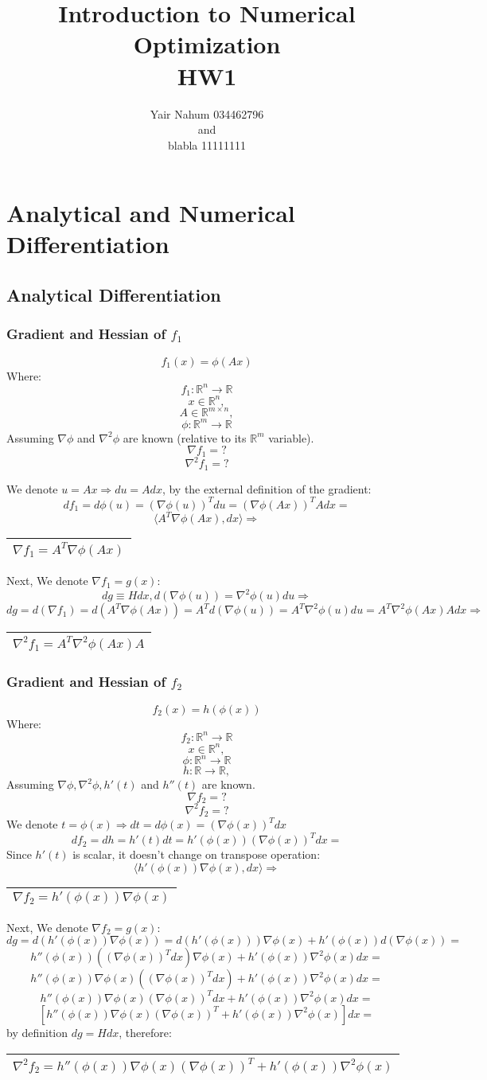 \documentclass{article}
\title{Introduction to Numerical Optimization\\HW1}
\author{Yair Nahum 034462796\\and\\blabla 11111111 }
\newcommand{\rectres}[1]{
\begin{center}
\begin{tabular}{ |c| }
\hline
 #1\\
\hline
\end{tabular}
\end{center}
}
\begin{document}
\maketitle


\section{Analytical and Numerical Differentiation}

\subsection{Analytical Differentiation}

\subsubsection{Gradient and Hessian of $f_1$}
$$f_1(x)=\phi(Ax)$$
Where:
$$f_1:\mathbb{R}^n \rightarrow \mathbb{R}$$
$$x \in \mathbb{R}^{n},$$
$$A \in \mathbb{R}^{m\times n},$$
$$\phi:\mathbb{R}^m \rightarrow \mathbb{R}$$
Assuming $\nabla\phi$ and $\nabla^2\phi$ are known (relative to its $\mathbb{R}^m$ variable).
$$\nabla f_1 = ?$$
$$\nabla^2 f_1 = ?$$

We denote $u=Ax \Rightarrow du=Adx$, by the external definition of the gradient:
$$df_1=d\phi(u)=(\nabla\phi(u))^T du = (\nabla\phi(Ax))^T A dx = $$
$$ \langle A^T\nabla \phi(Ax), dx \rangle \Rightarrow $$
\rectres{$\nabla f_1 = A^T\nabla \phi(Ax)$}
Next, We denote $\nabla f_1= g(x)$:
$$dg\equiv Hdx,d(\nabla \phi(u)) =  \nabla^2 \phi(u) du \Rightarrow$$
$$dg=d(\nabla f_1) = d(A^T\nabla \phi(Ax))=A^Td(\nabla \phi(u))=A^T\nabla^2 \phi(u) du = A^T\nabla^2 \phi(Ax) A dx \Rightarrow$$
\rectres{$\nabla^2 f_1 = A^T\nabla^2 \phi(Ax) A$}

\subsubsection{Gradient and Hessian of $f_2$}
$$f_2(x)=h(\phi(x))$$
Where:
$$f_2:\mathbb{R}^n \rightarrow \mathbb{R}$$
$$x \in \mathbb{R}^{n},$$
$$\phi:\mathbb{R}^n \rightarrow \mathbb{R}$$
$$h:\mathbb{R} \rightarrow \mathbb{R},$$
Assuming $\nabla\phi, \nabla^2\phi, h'(t)$ and $h''(t)$ are known.
$$\nabla f_2 = ?$$
$$\nabla^2 f_2 = ?$$
We denote $t=\phi(x)\Rightarrow dt=d\phi(x)=(\nabla \phi(x))^Tdx$
$$df_2= dh = h'(t)dt = h'(\phi(x))(\nabla \phi(x))^Tdx=$$
Since $h'(t)$ is scalar, it doesn't change on transpose operation:
$$\langle h'(\phi(x))\nabla \phi(x), dx \rangle \Rightarrow$$
\rectres{$\nabla f_2 = h'(\phi(x))\nabla \phi(x)$}
Next, We denote $\nabla f_2= g(x)$:
$$dg = d(h'(\phi(x))\nabla \phi(x)) =  d(h'(\phi(x)))\nabla \phi(x) + h'(\phi(x))d(\nabla \phi(x))=$$
$$h''(\phi(x))((\nabla \phi(x))^Tdx)\nabla \phi(x) + h'(\phi(x))\nabla^2 \phi(x)dx=$$
$$h''(\phi(x))\nabla \phi(x)((\nabla \phi(x))^Tdx) + h'(\phi(x))\nabla^2 \phi(x)dx=$$
$$h''(\phi(x))\nabla \phi(x)(\nabla \phi(x))^Tdx + h'(\phi(x))\nabla^2 \phi(x)dx=$$
$$[h''(\phi(x))\nabla \phi(x)(\nabla \phi(x))^T + h'(\phi(x))\nabla^2 \phi(x)]dx=$$
by definition $dg=Hdx$, therefore:
\rectres{$\nabla^2 f_2 = h''(\phi(x))\nabla \phi(x)(\nabla \phi(x))^T + h'(\phi(x))\nabla^2 \phi(x)$}
\newpage
\end{document}
